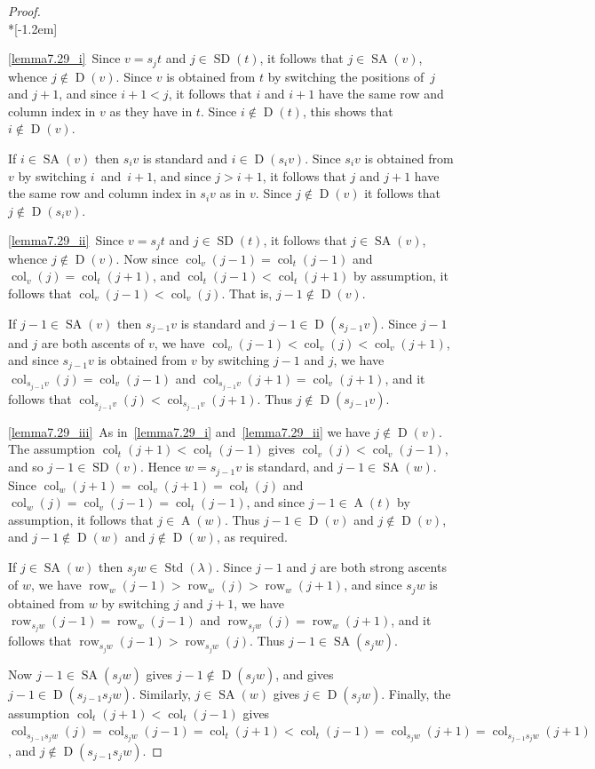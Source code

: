 \documentclass[ALCO,ThmDefs,Unicode,epreuves]{cedram}
\DeclareMathOperator{\row}{row}
\DeclareMathOperator{\col}{col}
\DeclareMathOperator{\STD}{Std}
\DeclareMathOperator{\SD}{SD}
\DeclareMathOperator{\SA}{SA}
\DeclareMathOperator{\D}{D}
\DeclareMathOperator{\A}{A}
\begin{document}
\begin{proof} \ \\*[-1.2em]

\ref{lemma7.29_i}~Since $v=s_jt$ and $j\in\SD(t)$, it follows that $j\in\SA(v)$,
whence $j\notin\D(v)$.
Since $v$ is obtained from $t$ by switching the positions of~$j$ and $j+1$,
and since $i+1<j$, it follows that $i$ and $i+1$ have the same row and column
index in $v$ as they have in $t$. Since $i\notin\D(t)$, this shows that
$i\notin\D(v)$.

If $i\in\SA(v)$ then $s_iv$ is standard and $i\in\D(s_iv)$.
Since $s_iv$ is obtained from $v$ by switching $i$~and~$i+1$,
and since $j>i+1$, it follows that $j$ and $j+1$ have the same row and column
index in $s_iv$ as in $v$. Since $j\notin\D(v)$ it follows
that $j\notin\D(s_iv)$.

\ref{lemma7.29_ii}~Since $v=s_jt$ and $j\in\SD(t)$, it follows that $j\in\SA(v)$,
whence $j\notin\D(v)$. Now since $\col_v(j-1)=\col_t(j-1)$ and $\col_v(j)=\col_t(j+1)$,
and $\col_t(j-1)<\col_t(j+1)$ by assumption, it follows that $\col_v(j-1)<\col_v(j)$.
That is, $j-1\notin\D(v)$.

If $j-1\in\SA(v)$ then $s_{j-1}v$ is standard and $j-1\in\D(s_{j-1}v)$.
Since $j-1$ and $j$ are both ascents of $v$, we have $\col_v(j-1)<\col_v(j)<\col_v(j+1)$,
and since $s_{j-1}v$ is obtained from $v$ by switching $j-1$ and $j$, we have
$\col_{s_{j-1}v}(j)=\col_v(j-1)$ and $\col_{s_{j-1}v}(j+1)=\col_v(j+1)$, and
it follows that $\col_{s_{j-1}v}(j)<\col_{s_{j-1}v}(j+1)$. Thus $j\notin\D(s_{j-1}v)$.

\ref{lemma7.29_iii}~As in~\ref{lemma7.29_i} and~\ref{lemma7.29_ii} we have $j\notin\D(v)$. The assumption $\col_t(j+1)<\col_t(j-1)$
gives $\col_v(j)<\col_v(j-1)$, and so $j-1\in\SD(v)$. Hence $w=s_{j-1}v$ is standard,
and $j-1\in\SA(w)$. Since $\col_w(j+1)=\col_v(j+1)=\col_t(j)$ and
$\col_w(j)=\col_v(j-1)=\col_t(j-1)$, and since $j-1\in\A(t)$ by assumption, it follows
that $j\in \A(w)$. Thus $j-1\in\D(v)$ and $j\notin\D(v)$, and $j-1\notin\D(w)$ and
$j\notin\D(w)$, as required.

If $j\in\SA(w)$ then $s_jw\in\STD(\lambda)$. Since $j-1$ and $j$ are both strong ascents of
$w$, we have $\row_w(j-1)>\row_w(j)>\row_w(j+1)$, and since $s_jw$ is obtained from $w$
by switching $j$ and $j+1$, we have $\row_{s_jw}(j-1)=\row_w(j-1)$ and
$\row_{s_jw}(j)=\row_w(j+1)$, and it follows that $\row_{s_jw}(j-1)>\row_{s_jw}(j)$.
Thus $j-1\in\SA(s_jw)$.

Now $j-1\in\SA(s_jw)$ gives $j-1\notin\D(s_jw)$, and gives
$j-1\in\D(s_{j-1}s_jw)$. Similarly, $j\in\SA(w)$ gives
$j\in\D(s_jw)$. Finally, the assumption $\col_t(j+1)<\col_t(j-1)$ gives
$\col_{s_{j-1}s_jw}(j)=\col_{s_jw}(j-1)=\col_t(j+1)<\col_t(j-1)=\col_{s_jw}(j+1)
=\col_{s_{j-1}s_jw}(j+1)$, and $j\notin\D(s_{j-1}s_jw)$.
\end{proof}
\end{document}
